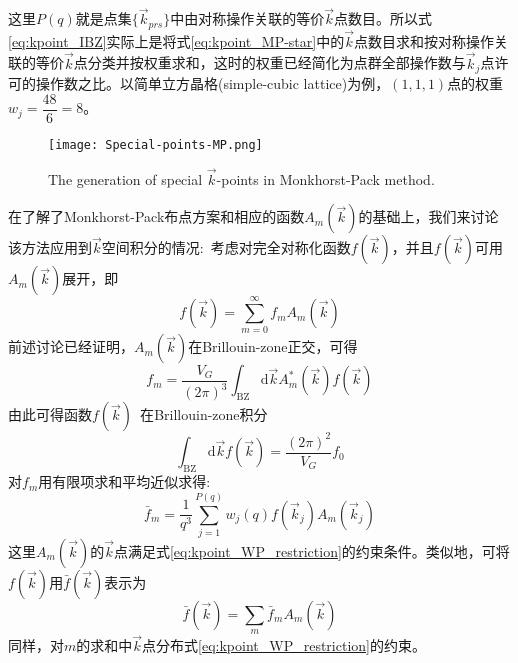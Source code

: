 这里$P(q)$就是点集$\{\vec k_{prs}\}$中由对称操作关联的等价$\vec k$点数目。所以式\eqref{eq:kpoint_IBZ}实际上是将式\eqref{eq:kpoint_MP-star}中的$\vec k$点数目求和按对称操作关联的等价$\vec k$点分类并按权重求和，这时的权重已经简化为点群全部操作数与$\vec k_j$点许可的操作数之比。以简单立方晶格\textrm{(simple-cubic lattice)}为例，$(1,1,1)$点的权重$w_j=\dfrac{48}6=8$。
\begin{figure}[h!]
\centering
\vspace*{-0.6in}
\texttt{[image: Special-points-MP.png]}
\caption{\small \textrm{The generation of special $\vec k$-points in \textrm{Monkhorst-Pack} method.}}%
\label{Special-points-MP}
\end{figure} 

在了解了\textrm{Monkhorst-Pack}布点方案和相应的函数$A_m(\vec k)$的基础上，我们来讨论该方法应用到$\vec k$空间积分的情况:~考虑对完全对称化函数$f(\vec k)$，并且$f(\vec k)$可用$A_m(\vec k)$展开，即
	\begin{equation}
		f(\vec k)=\sum_{m=0}^{\infty}f_mA_m(\vec k)
		\label{eq:solid_kpoint_fourier}
	\end{equation}
前述讨论已经证明，$A_m(\vec k)$在\textrm{Brillouin-zone}正交，可得
	$$f_m=\dfrac{V_G}{(2\pi)^3}\int_{\mathrm{BZ}}\mathrm{d}\vec kA_m^{\ast}(\vec k)f(\vec k)$$
由此可得函数$f(\vec k)$~在\textrm{Brillouin-zone}积分
\begin{equation}
	\int_{\mathrm{BZ}}\mathrm{d}\vec kf(\vec k)=\dfrac{(2\pi)^2}{V_G}f_0
	\label{eq:kpoint_MP_int}
\end{equation}
对$f_m$用有限项求和平均近似求得:~	%
\begin{equation}
	\bar f_m=\dfrac1{q^3}\sum_{j=1}^{P(q)}w_j(q)f(\vec k_j)A_m(\vec k_j)
	\label{eq:kpoint_MP_intapp}
\end{equation}
这里$A_m(\vec k)$的$\vec k$点满足式\eqref{eq:kpoint_WP_restriction}的约束条件。类似地，可将$f(\vec k)$用$\bar f(\vec k)$表示为
	$$\bar f(\vec k)=\sum_m\bar f_mA_m(\vec k)$$
同样，对$m$的求和中$\vec k$点分布式\eqref{eq:kpoint_WP_restriction}的约束。
	

